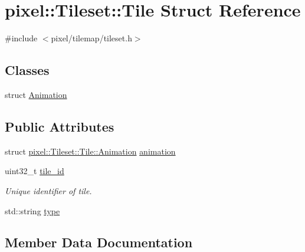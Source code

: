 \hypertarget{structpixel_1_1_tileset_1_1_tile}{}\section{pixel\+:\+:Tileset\+:\+:Tile Struct Reference}
\label{structpixel_1_1_tileset_1_1_tile}


{\ttfamily \#include $<$pixel/tilemap/tileset.\+h$>$}

\subsection*{Classes}
\begin{DoxyCompactItemize}
\item 
struct \hyperlink{structpixel_1_1_tileset_1_1_tile_1_1_animation}{Animation}
\end{DoxyCompactItemize}
\subsection*{Public Attributes}
\begin{DoxyCompactItemize}
\item 
struct \hyperlink{structpixel_1_1_tileset_1_1_tile_1_1_animation}{pixel\+::\+Tileset\+::\+Tile\+::\+Animation} \hyperlink{structpixel_1_1_tileset_1_1_tile_a4bb48a8df11fd7c4b8dc5959c0da54ce}{animation}
\item 
uint32\+\_\+t \hyperlink{structpixel_1_1_tileset_1_1_tile_aea8eb01c2f67c1cac8cbf12bbbf3d741}{tile\+\_\+id}
\begin{DoxyCompactList}\small\item\em Unique identifier of tile. \end{DoxyCompactList}\item 
std\+::string \hyperlink{structpixel_1_1_tileset_1_1_tile_aea4a964f0eb344459f06a7e9c5552f95}{type}
\end{DoxyCompactItemize}


\subsection{Member Data Documentation}
\mbox{\label{structpixel_1_1_tileset_1_1_tile_a4bb48a8df11fd7c4b8dc5959c0da54ce}} 
